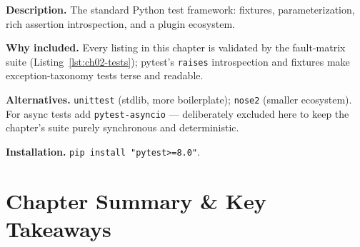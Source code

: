 \textbf{Description.} The standard Python test framework: fixtures,
parameterization, rich assertion introspection, and a plugin ecosystem.

\textbf{Why included.} Every listing in this chapter is validated by the
fault-matrix suite (Listing~\ref{lst:ch02-tests}); pytest's
\texttt{raises} introspection and fixtures make exception-taxonomy tests
terse and readable.

\textbf{Alternatives.} \texttt{unittest} (stdlib, more boilerplate);
\texttt{nose2} (smaller ecosystem). For async tests add
\texttt{pytest-asyncio} --- deliberately excluded here to keep the chapter's
suite purely synchronous and deterministic.

\textbf{Installation.} \texttt{pip install "pytest>=8.0"}.


\section{Chapter Summary \& Key Takeaways}

